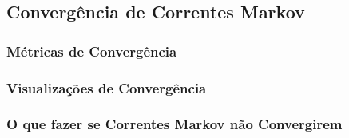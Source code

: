 
\subsection{Convergência de Correntes Markov}

\subsubsection{Métricas de Convergência}

\subsubsection{Visualizações de Convergência}

\subsubsection{O que fazer se Correntes Markov não Convergirem}
